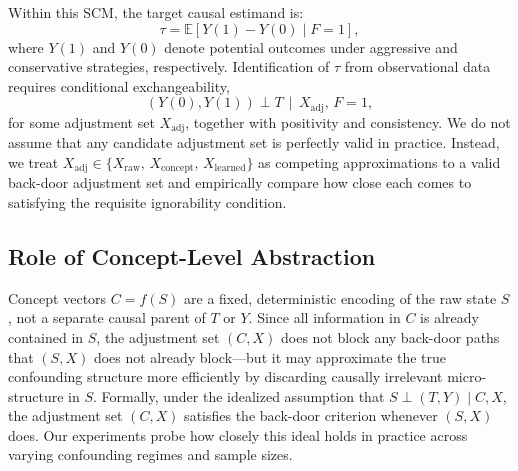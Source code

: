 \documentclass{article}
\begin{document}
Within this SCM, the target causal estimand is:
\[
\tau = \mathbb{E}[Y(1) - Y(0) \mid F = 1],
\]
where \(Y(1)\) and \(Y(0)\) denote potential outcomes under aggressive and
conservative strategies, respectively. Identification of \(\tau\) from observational
data requires conditional exchangeability,
\[
(Y(0), Y(1)) \perp T \,\mid\, X_{\text{adj}},\, F=1,
\]
for some adjustment set \(X_{\text{adj}}\), together with positivity and
consistency.\cite{pearl2009causality,hill2011bayesian} We do not assume that any
candidate adjustment set is perfectly valid in practice. Instead, we treat
$X_{\text{adj}} \in \{ X_{\text{raw}},\, X_{\text{concept}},\, X_{\text{learned}} \}$
as competing approximations to a valid back-door adjustment set and empirically
compare how close each comes to satisfying the requisite ignorability condition.

\subsection{Role of Concept-Level Abstraction}

Concept vectors \(C = f(S)\) are a fixed, deterministic encoding of the raw state
\(S\), not a separate causal parent of \(T\) or \(Y\). Since all information in
\(C\) is already contained in \(S\), the adjustment set \((C, X)\) does not block
any back-door paths that \((S, X)\) does not already block---but it may approximate
the true confounding structure more efficiently by discarding causally irrelevant
micro-structure in \(S\). Formally, under the idealized assumption that $S \perp
(T,Y) \mid C, X$, the adjustment set $(C, X)$ satisfies the back-door criterion
whenever $(S, X)$ does. Our experiments probe how closely this ideal holds in
practice across varying confounding regimes and sample sizes.
\end{document}
